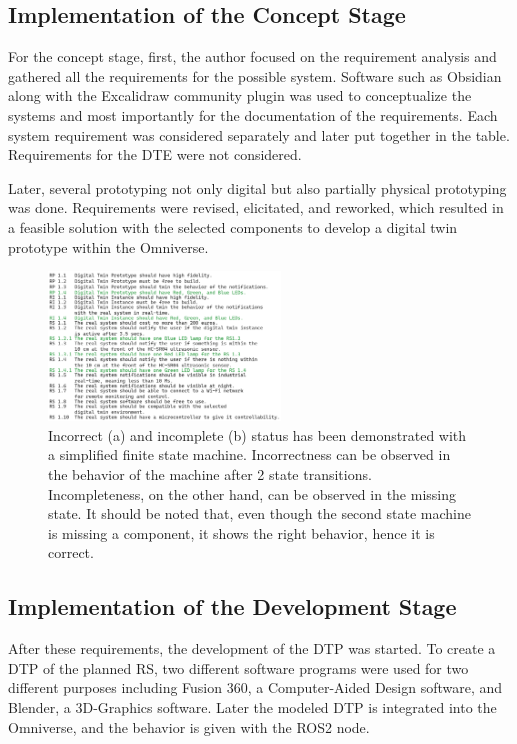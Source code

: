 \documentclass[conference]{IEEEtran}
\begin{document}
    \subsection{Implementation of the Concept Stage}
    For the concept stage, first, the author focused on the requirement analysis and gathered all the requirements for the possible system. Software such as Obsidian along with the Excalidraw community plugin was used to conceptualize the systems and most importantly 
    for the documentation of the requirements. Each system requirement was considered separately and later put together in the table. Requirements for the DTE were not considered.    

    Later, several prototyping not only digital but also partially physical prototyping was done. 
    Requirements were revised, elicitated, and reworked, which resulted in a feasible solution with the selected components to develop a digital twin prototype within the Omniverse.
    
    \begin{figure}[htbp]
        \centering
        \includegraphics[width=0.55\textwidth]{Requirements.png}
        \caption{Incorrect (a) and incomplete (b) status has been demonstrated with a simplified finite state machine. Incorrectness can be observed in the behavior 
        of the machine after 2 state transitions. Incompleteness, on the other hand, can be observed in the missing state. It should be noted that, even though the second state machine is missing a 
        component, it shows the right behavior, hence it is correct.}\label{fig:Requirements}
    \end{figure}

    \subsection{Implementation of the Development Stage}
    After these requirements, the development of the DTP was started. To create a DTP of the planned RS, two different software programs were used for two different purposes including Fusion 360, 
    a Computer-Aided Design software, and Blender, a 3D-Graphics software. Later the modeled DTP is integrated into the Omniverse, and the behavior is given with the ROS2 node.
\end{document}
